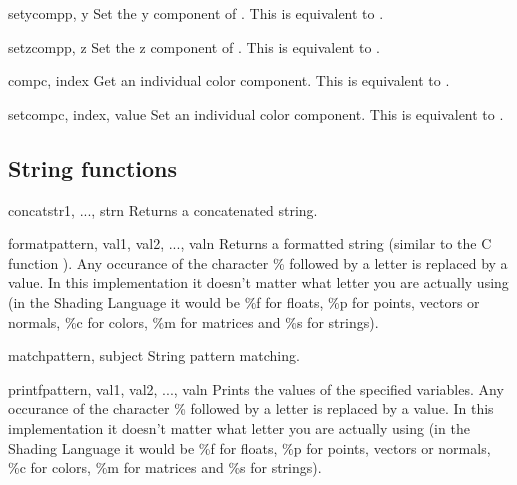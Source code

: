 \begin{funcdesc}{setycomp}{p, y}
Set the y component of . This is equivalent to .
\end{funcdesc}

\begin{funcdesc}{setzcomp}{p, z}
Set the z component of . This is equivalent to .
\end{funcdesc}

\begin{funcdesc}{comp}{c, index}
Get an individual color component. This is equivalent to .
\end{funcdesc}

\begin{funcdesc}{setcomp}{c, index, value}
Set an individual color component. This is equivalent to 
.
\end{funcdesc}

\subsection{String functions}

\begin{funcdesc}{concat}{str1, ..., strn}
Returns a concatenated string.
\end{funcdesc}

\begin{funcdesc}{format}{pattern, val1, val2, ..., valn}
Returns a formatted string (similar to the C function
). Any occurance of the character \% followed by a
letter is replaced by a value. In this implementation it doesn't
matter what letter you are actually using (in the Shading Language it
would be \%f for floats, \%p for points, vectors or normals, \%c for
colors, \%m for matrices and \%s for strings).
\end{funcdesc}

\begin{funcdesc}{match}{pattern, subject}
String pattern matching.
\end{funcdesc}

\begin{funcdesc}{printf}{pattern, val1, val2, ..., valn}
Prints the values of the specified variables. Any occurance of the
character \% followed by a letter is replaced by a value. In this
implementation it doesn't matter what letter you are actually using (in
the Shading Language it would be \%f for floats, \%p for points, vectors
or normals, \%c for colors, \%m for matrices and \%s for strings).
\end{funcdesc}

